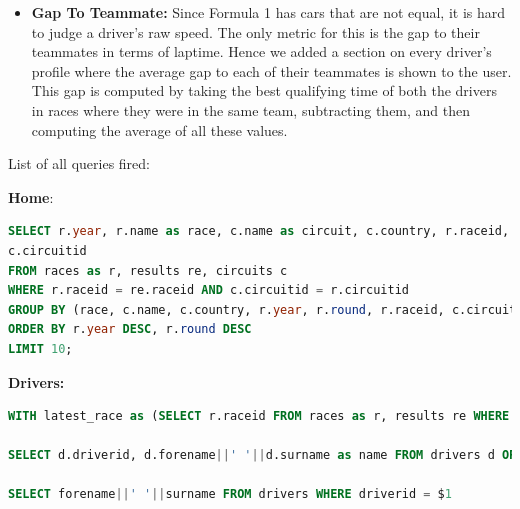 \documentclass{article}
\begin{document}
\begin{enumerate}
\begin{itemize}
		\item \textbf{Gap To Teammate:} Since Formula 1 has cars that are not equal, it is hard to judge a driver's raw speed. The only metric for this is the gap to their teammates in terms of laptime. Hence we added a section on every driver's profile where the average gap to each of their teammates is shown to the user. This gap is computed by taking the best qualifying time of both the drivers in races where they were in the same team, subtracting them, and then computing the average of all these values.
	\end{itemize}

	List of all queries fired:

	\textbf{Home}:\\
        \begin{lstlisting}[language=SQL]
SELECT r.year, r.name as race, c.name as circuit, c.country, r.raceid, 
c.circuitid
FROM races as r, results re, circuits c
WHERE r.raceid = re.raceid AND c.circuitid = r.circuitid
GROUP BY (race, c.name, c.country, r.year, r.round, r.raceid, c.circuitid)
ORDER BY r.year DESC, r.round DESC
LIMIT 10;
\end{lstlisting}\vspace{6mm}


\textbf{Drivers:}
\begin{lstlisting}[language=SQL]
WITH latest_race as (SELECT r.raceid FROM races as r, results re WHERE r.raceid = re.raceid ORDER BY r.year DESC, r.round DESC LIMIT 1) SELECT d.driverid, d.forename||' '||d.surname as driver, c.constructorid, c.name as constructor FROM results r, constructors c, drivers d WHERE r.raceid = (SELECT * FROM latest_race) AND c.constructorid = r.constructorid AND d.driverid = r.driverid ORDER BY r.constructorid

SELECT d.driverid, d.forename||' '||d.surname as name FROM drivers d ORDER BY name ASC

SELECT forename||' '||surname FROM drivers WHERE driverid = $1


\end{lstlisting}
\end{enumerate}
\end{document}
